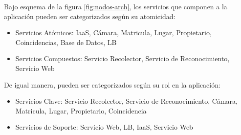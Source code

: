         Bajo esquema de la figura \ref{fig:nodos-arch}, los servicios que componen a la aplicación pueden ser categorizados según su atomicidad:
        \begin{itemize}
            \item Servicios Atómicos: IaaS, Cámara, Matricula, Lugar, Propietario, Coincidencias, Base de Datos, LB
            \item Servicios Compuestos: Servicio Recolector, Servicio de Reconocimiento, Servicio Web
        \end{itemize}
        De igual manera, pueden ser categorizados según su rol en la aplicación:
        \begin{itemize}
            \item Servicios Clave: Servicio Recolector, Servicio de Reconocimiento, Cámara, Matricula, Lugar, Propietario, Coincidencia
            \item Servicios de Soporte: Servicio Web, LB, IaaS, Servicio Web
        \end{itemize}
    
       
        
        
